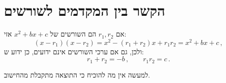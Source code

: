 
\section{הקשר בין המקדמים לשורשים}\label{s.computing}


\begin{theorem}\label{thm.roots-coefficients}
אם
$r_1,r_2$
הם השורשים של
$x^2+bx+c$
אזי:
\[
(x-r_1)(x-r_2)=x^2 - (r_1+r_2)x + r_1r_2=x^2+bx+c\,,
\]
ולכן, גם אם ערכי השורשים אינם ידועים, כן ידוע ש:
\begin{equation}\label{eq.viete-quad}
r_1+r_2 = -b\,,\quad\quad r_1r_2=c\,.
\end{equation}
\end{theorem}
למעשה אין מה להוכיח כי התוצאה מתקבלת מהחישוב.

